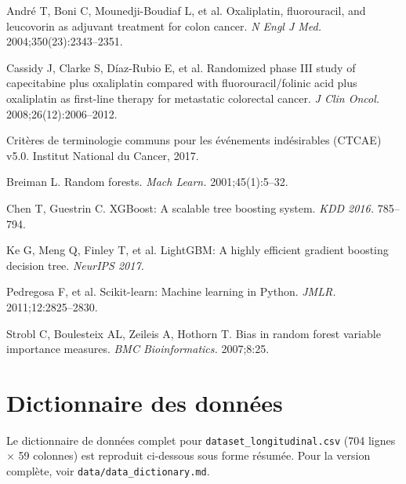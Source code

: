 \documentclass[12pt,a4paper]{report}
\begin{document}
\begin{enumerate}[label={[\arabic*]}]
  \item André T, Boni C, Mounedji-Boudiaf L, et al. Oxaliplatin, fluorouracil, and leucovorin as adjuvant treatment for colon cancer. \textit{N Engl J Med.} 2004;350(23):2343--2351.
  \item Cassidy J, Clarke S, Díaz-Rubio E, et al. Randomized phase III study of capecitabine plus oxaliplatin compared with fluorouracil/folinic acid plus oxaliplatin as first-line therapy for metastatic colorectal cancer. \textit{J Clin Oncol.} 2008;26(12):2006--2012.
  \item Critères de terminologie communs pour les événements indésirables (CTCAE) v5.0. Institut National du Cancer, 2017.
  \item Breiman L. Random forests. \textit{Mach Learn.} 2001;45(1):5--32.
  \item Chen T, Guestrin C. XGBoost: A scalable tree boosting system. \textit{KDD 2016.} 785--794.
  \item Ke G, Meng Q, Finley T, et al. LightGBM: A highly efficient gradient boosting decision tree. \textit{NeurIPS 2017.}
  \item Pedregosa F, et al. Scikit-learn: Machine learning in Python. \textit{JMLR.} 2011;12:2825--2830.
  \item Strobl C, Boulesteix AL, Zeileis A, Hothorn T. Bias in random forest variable importance measures. \textit{BMC Bioinformatics.} 2007;8:25.
\end{enumerate}

\appendix

\chapter{Dictionnaire des données}
\label{app:dict}

Le dictionnaire de données complet pour \texttt{dataset\_longitudinal.csv} (704 lignes $\times$ 59 colonnes) est reproduit ci-dessous sous forme résumée. Pour la version complète, voir \texttt{data/data\_dictionary.md}.
\end{document}
